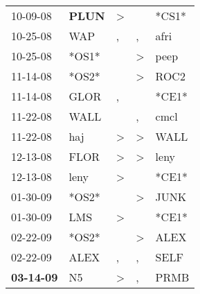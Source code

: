 \begin{supertabular}{p{0.07\textwidth}p{0.06\textwidth}p{0.02\textwidth}p{0.02\textwidth}p{0.06\textwidth}}
          10-09-08\textsuperscript{} &  \textbf{PLUN\textsuperscript{}} &     \textgreater &                  &                            *CS1* \\
          10-25-08\textsuperscript{} &            WAP\textsuperscript{} &                , &                , &           afri\textsuperscript{} \\
          10-25-08\textsuperscript{} &                            *OS1* &                  &     \textgreater &           peep\textsuperscript{} \\
          11-14-08\textsuperscript{} &                            *OS2* &                  &     \textgreater &           ROC2\textsuperscript{} \\
          11-14-08\textsuperscript{} &           GLOR\textsuperscript{} &                , &                  &                            *CE1* \\
          11-22-08\textsuperscript{} &           WALL\textsuperscript{} &                  &                , &           cmcl\textsuperscript{} \\
          11-22-08\textsuperscript{} &            haj\textsuperscript{} &     \textgreater &     \textgreater &           WALL\textsuperscript{} \\
          12-13-08\textsuperscript{} &           FLOR\textsuperscript{} &     \textgreater &     \textgreater &           leny\textsuperscript{} \\
          12-13-08\textsuperscript{} &           leny\textsuperscript{} &     \textgreater &                  &                            *CE1* \\
          01-30-09\textsuperscript{} &                            *OS2* &                  &     \textgreater &           JUNK\textsuperscript{} \\
          01-30-09\textsuperscript{} &            LMS\textsuperscript{} &     \textgreater &                  &                            *CE1* \\
          02-22-09\textsuperscript{} &                            *OS2* &                  &     \textgreater &           ALEX\textsuperscript{} \\
          02-22-09\textsuperscript{} &           ALEX\textsuperscript{} &                , &                , &           SELF\textsuperscript{} \\
 \textbf{03-14-09\textsuperscript{}} &             N5\textsuperscript{} &     \textgreater &                , &           PRMB\textsuperscript{} \\

\end{supertabular}
